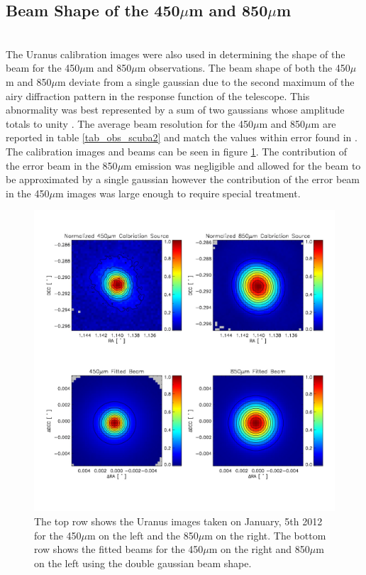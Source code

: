 \subsection{Beam Shape of the 450$\mu$m and 850$\mu$m} \\
The Uranus calibration images were also used in determining the shape of the beam for the 450$\mu$m and 850$\mu$m observations.  The beam shape of both the 450$\mu$m and 850$\mu$m deviate from a single gaussian due to the second maximum of the airy diffraction pattern in the response function of the telescope.  This abnormality was best represented by a sum of two gaussians whose amplitude totals to unity \citep{dempsey2013}.  The average beam resolution for the 450$\mu$m and 850$\mu$m are reported in table \ref{tab_obs_scuba2} and match the values within error found in \citep{dempsey2013}.  The calibration images and beams can be seen in figure \ref{fig_calib}.  The contribution of the error beam in the 850$\mu$m emission was negligible and allowed for the beam to be approximated by a single gaussian however the contribution of the error beam in the 450$\mu$m images was large enough to require special treatment.

\begin{figure}
  \label{fig_calib}
  \centering
  \includegraphics[scale=0.5]{obs_imgs/calib_beams.jpeg}
  \caption[SCUBA-2 Calibration and Beams]{The top row shows the Uranus images taken on January, 5th 2012 for the 450$\mu$m on the left and the 850$\mu$m on the right.  The bottom row shows the fitted beams for the 450$\mu$m on the right and 850$\mu$m on the left using the double gaussian beam shape.}
\end{figure}

